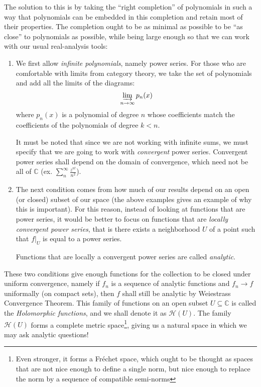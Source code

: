 \documentclass[oneside]{article}
\newcommand{\C}{\mathbb{C}}
\newcommand{\CH}{\mathcal{H}}
\newcommand{\sse}{\subseteq}
\newcommand{\colim}{\varinjlim}
\begin{document}
The solution to this is by taking the ``right completion'' of polynomials in such a way that polynomials can
be embedded in this completion and retain most of their properties. The completion ought to be as minimal
as possible to be ``as close'' to polynomials as possible, while being large enough so that we can work with
our usual real-analysis tools:

\begin{enumerate}
  \item We first allow \emph{infinite polynomials}, namely power series. For those who are comfortable with
    limits from category theory, we take the set of polynomials and add all the limits of the diagrams:
    \[
      \colim_{n \to \infty} p_n(x)
    \]
    where $p_n(x)$ is a polynomial of degree $n$ whose coefficients match the coefficients of the polynomials of
    degree $k< n$.

    It must be noted that since we are not working with infinite sums, we must specify that we are going to
    work with \emph{convergent} power series. Convergent power series shall depend on the domain of
    convergence, which need not be all of $\C$ (ex. $\sum_n^\infty \frac{z^{n!}}{n^2}$).
   \item The next condition comes from how much of our results depend on an open (or closed) subset of our
     space (the above examples gives an example of why this is important). For this reason, instead of looking at functions
     that are power series, it would be better to focus on functions that are \emph{locally convergent power series},
     that is there exists a neighborhood $U$ of a point such that $f|_U$ is equal to a power series.

     Functions that are locally a convergent power series are called \emph{analytic}.
\end{enumerate}

These two conditions give enough functions for the collection to be closed under uniform convergence, namely
if $f_n$ is a sequence of analytic functions and  $f_n \to f$ uniformally (on compact sets), then $f$ shall
still be analytic by Weiestrass Convergence Theorem. This family of functions on an open subset
$U \sse \C$ is called the \emph{Holomorphic functions}, and we shall denote it as $\CH(U)$. The family
$\CH(U)$ forms a complete metric space\footnote{Even stronger, it forms a Fr\'echet space, which ought to be
  thought as spaces that are not nice enough to define a single norm, but nice enough to replace the norm by a
sequence of compatible semi-norms}, giving us a natural space in which we may ask analytic questions!
\end{document}
